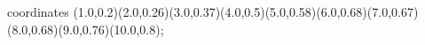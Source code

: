 					coordinates { (1.0,0.2)(2.0,0.26)(3.0,0.37)(4.0,0.5)(5.0,0.58)(6.0,0.68)(7.0,0.67)(8.0,0.68)(9.0,0.76)(10.0,0.8)};